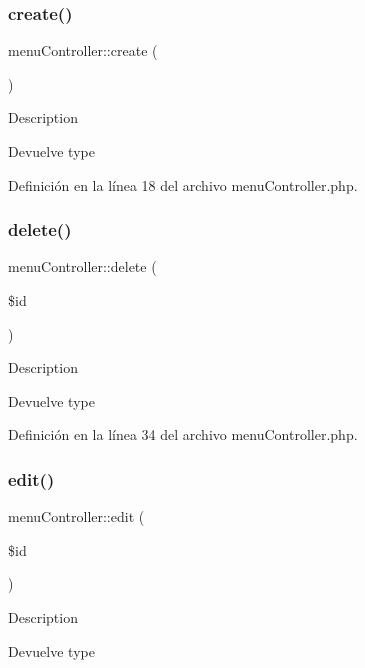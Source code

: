 \subsubsection{\texorpdfstring{create()}{create()}}
{\footnotesize\ttfamily menu\+Controller\+::create (\begin{DoxyParamCaption}{ }\end{DoxyParamCaption})}

Description \begin{DoxyReturn}{Devuelve}
type 
\end{DoxyReturn}


Definición en la línea 18 del archivo menu\+Controller.\+php.

\mbox{\label{classmenu_controller_a3e835912cd6cdd07fd0eb71bac19c675}} 
\subsubsection{\texorpdfstring{delete()}{delete()}}
{\footnotesize\ttfamily menu\+Controller\+::delete (\begin{DoxyParamCaption}\item[{}]{\$id }\end{DoxyParamCaption})}

Description \begin{DoxyReturn}{Devuelve}
type 
\end{DoxyReturn}


Definición en la línea 34 del archivo menu\+Controller.\+php.

\mbox{\label{classmenu_controller_a302abc24e5cf18433bffd1b3eae79dd1}} 
\subsubsection{\texorpdfstring{edit()}{edit()}}
{\footnotesize\ttfamily menu\+Controller\+::edit (\begin{DoxyParamCaption}\item[{}]{\$id }\end{DoxyParamCaption})}

Description \begin{DoxyReturn}{Devuelve}
type 
\end{DoxyReturn}


